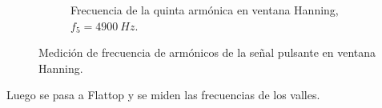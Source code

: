 \begin{figure}[H]
\begin{subfigure}[H]{0.48\textwidth}
          \caption{Frecuencia de la quinta armónica en ventana Hanning, $f_{5}=4900~Hz$.}
        \end{subfigure}

        \caption{Medición de frecuencia de armónicos de la señal pulsante en ventana Hanning.}
        \label{fig:Exp2SeñalPulsanteArmonicosEspectro}
      \end{figure}     

      Luego se pasa a Flattop y se miden las frecuencias de los valles.

